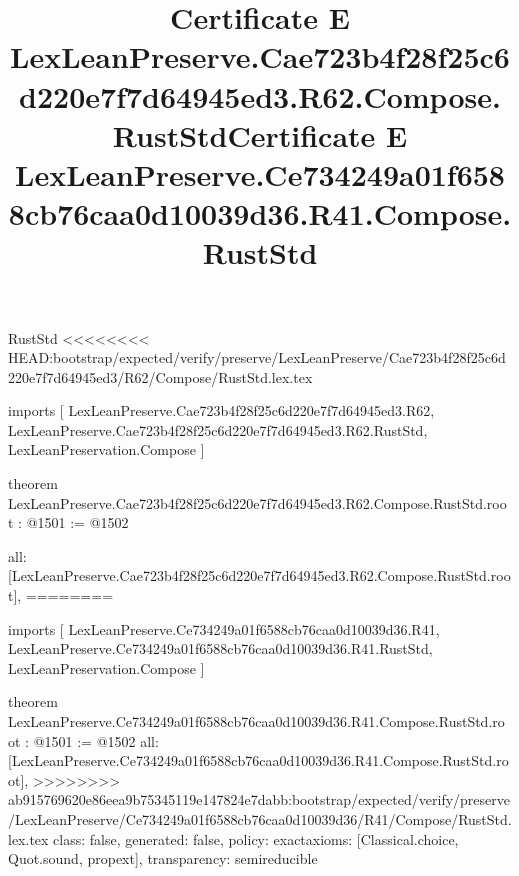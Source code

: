 \begin{lexlean}{RustStd}
<<<<<<<< HEAD:bootstrap/expected/verify/preserve/LexLeanPreserve/Cae723b4f28f25c6d220e7f7d64945ed3/R62/Compose/RustStd.lex.tex
\title{Certificate E LexLeanPreserve.Cae723b4f28f25c6d220e7f7d64945ed3.R62.Compose.RustStd}
\begin{coremodule}
imports [
  LexLeanPreserve.Cae723b4f28f25c6d220e7f7d64945ed3.R62,
  LexLeanPreserve.Cae723b4f28f25c6d220e7f7d64945ed3.R62.RustStd,
  LexLeanPreservation.Compose
]

theorem LexLeanPreserve.Cae723b4f28f25c6d220e7f7d64945ed3.R62.Compose.RustStd.root : @1501 := @1502 {
  all: [LexLeanPreserve.Cae723b4f28f25c6d220e7f7d64945ed3.R62.Compose.RustStd.root],
========
\title{Certificate E LexLeanPreserve.Ce734249a01f6588cb76caa0d10039d36.R41.Compose.RustStd}
\begin{coremodule}
imports [
  LexLeanPreserve.Ce734249a01f6588cb76caa0d10039d36.R41,
  LexLeanPreserve.Ce734249a01f6588cb76caa0d10039d36.R41.RustStd,
  LexLeanPreservation.Compose
]

theorem LexLeanPreserve.Ce734249a01f6588cb76caa0d10039d36.R41.Compose.RustStd.root : @1501 := @1502 {
  all: [LexLeanPreserve.Ce734249a01f6588cb76caa0d10039d36.R41.Compose.RustStd.root],
>>>>>>>> ab915769620e86eea9b75345119e147824e7dabb:bootstrap/expected/verify/preserve/LexLeanPreserve/Ce734249a01f6588cb76caa0d10039d36/R41/Compose/RustStd.lex.tex
  class: false,
  generated: false,
  policy: exact{axioms: [Classical.choice, Quot.sound, propext]},
  transparency: semireducible
}


\end{coremodule}}
\end{coremodule}
\end{lexlean}
